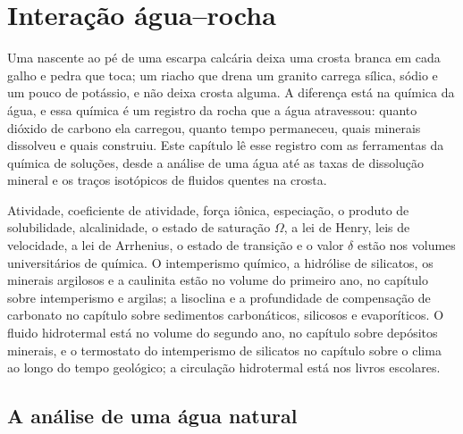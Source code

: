 \chapter{Interação água--rocha}\label{ch:b3:water-rock-interaction}

Uma nascente ao pé de uma escarpa calcária deixa uma crosta branca em cada
galho e pedra que toca; um riacho que drena um granito carrega sílica, sódio
e um pouco de potássio, e não deixa crosta alguma. A diferença está na
química da água, e essa química é um registro da rocha que a água
atravessou: quanto dióxido de carbono ela carregou, quanto tempo permaneceu, quais
minerais dissolveu e quais construiu. Este capítulo lê esse registro com
as ferramentas da química de soluções, desde a análise de uma água até as taxas de
dissolução mineral e os traços isotópicos de fluidos quentes na crosta.

\begin{recall}
Atividade, coeficiente de atividade, força iônica, especiação, o produto de
solubilidade, alcalinidade, o estado de saturação $\Omega$, a lei de Henry, leis de
velocidade, a lei de Arrhenius, o estado de transição e o valor $\delta$ estão nos
volumes universitários de química. O intemperismo químico, a hidrólise de
silicatos, os minerais argilosos e a caulinita estão no volume do primeiro ano, no
capítulo sobre intemperismo e argilas; a lisoclina e a profundidade de compensação
de carbonato no capítulo sobre sedimentos carbonáticos, silicosos e evaporíticos. O
fluido hidrotermal está no volume do segundo ano, no capítulo sobre depósitos
minerais, e o termostato do intemperismo de silicatos no capítulo sobre o clima ao longo
do tempo geológico; a circulação hidrotermal está nos livros escolares.
\end{recall}

\section{A análise de uma água natural}\label{sec:b3:water-rock-interaction:analysis}

